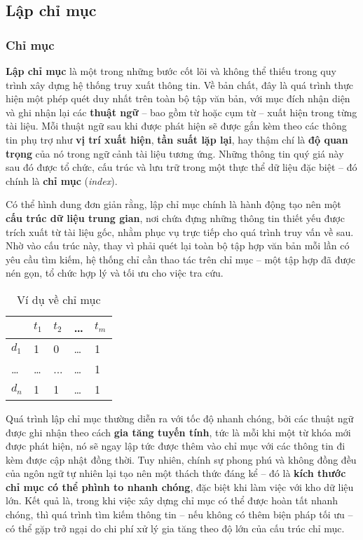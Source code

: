 \subsection{Lập chỉ mục}
\subsubsection{Chỉ mục}
\textbf{Lập chỉ mục} là một trong những bước cốt lõi và không thể thiếu trong quy trình xây dựng hệ thống truy xuất thông tin. Về bản chất, đây là quá trình thực hiện một phép quét duy nhất trên toàn bộ tập văn bản, với mục đích nhận diện và ghi nhận lại các \textbf{thuật ngữ} -- bao gồm từ hoặc cụm từ -- xuất hiện trong từng tài liệu. Mỗi thuật ngữ sau khi được phát hiện sẽ được gắn kèm theo các thông tin phụ trợ như \textbf{vị trí xuất hiện}, \textbf{tần suất lặp lại}, hay thậm chí là \textbf{độ quan trọng} của nó trong ngữ cảnh tài liệu tương ứng. Những thông tin quý giá này sau đó được tổ chức, cấu trúc và lưu trữ trong một thực thể dữ liệu đặc biệt -- đó chính là \textbf{chỉ mục} (\textit{index}).

Có thể hình dung đơn giản rằng, lập chỉ mục chính là hành động tạo nên một \textbf{cấu trúc dữ liệu trung gian}, nơi chứa đựng những thông tin thiết yếu được trích xuất từ tài liệu gốc, nhằm phục vụ trực tiếp cho quá trình truy vấn về sau. Nhờ vào cấu trúc này, thay vì phải quét lại toàn bộ tập hợp văn bản mỗi lần có yêu cầu tìm kiếm, hệ thống chỉ cần thao tác trên chỉ mục -- một tập hợp đã được nén gọn, tổ chức hợp lý và tối ưu cho việc tra cứu.

\begin{table}[H]
    \centering
    \caption{Ví dụ về chỉ mục}
    \begin{tabularx}{0.8\linewidth}{X || X X X X}
        \toprule
                & \(t_1\) & \(t_2\) & \dots & \(t_m\) \\
        \midrule\midrule
        \(d_1\) & 1       & 0       & \dots & 1       \\
        \dots   & \dots   & ...     & \dots & 1       \\
        \(d_n\) & 1       & 1       & \dots & 1       \\
        \bottomrule
    \end{tabularx}
\end{table}

Quá trình lập chỉ mục thường diễn ra với tốc độ nhanh chóng, bởi các thuật ngữ được ghi nhận theo cách \textbf{gia tăng tuyến tính}, tức là mỗi khi một từ khóa mới được phát hiện, nó sẽ ngay lập tức được thêm vào chỉ mục với các thông tin đi kèm được cập nhật đồng thời. Tuy nhiên, chính sự phong phú và không đồng đều của ngôn ngữ tự nhiên lại tạo nên một thách thức đáng kể -- đó là \textbf{kích thước chỉ mục có thể phình to nhanh chóng}, đặc biệt khi làm việc với kho dữ liệu lớn. Kết quả là, trong khi việc xây dựng chỉ mục có thể được hoàn tất nhanh chóng, thì quá trình tìm kiếm thông tin -- nếu không có thêm biện pháp tối ưu -- có thể gặp trở ngại do chi phí xử lý gia tăng theo độ lớn của cấu trúc chỉ mục.

